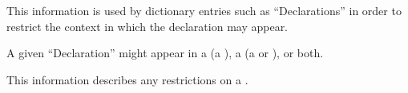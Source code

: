 
This information is used by dictionary entries such as ``Declarations''
in order to restrict the context in which the declaration may appear.

A given ``Declaration'' might appear in 
     a  (\ie a  ),
     a  (\ie a  or  ),
  or both.

\endsubsubsection%


This information describes any  restrictions on a .

\endsubsubsection%

\endsubSection%
